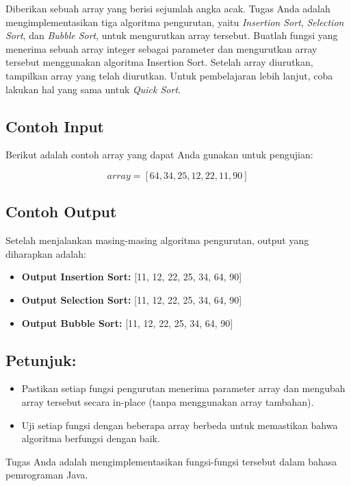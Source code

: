 Diberikan sebuah array yang berisi sejumlah angka acak. Tugas Anda adalah mengimplementasikan tiga algoritma pengurutan, yaitu \textit{Insertion Sort}, \textit{Selection Sort}, dan \textit{Bubble Sort}, untuk mengurutkan array tersebut. Buatlah fungsi yang menerima sebuah array integer sebagai parameter dan mengurutkan array tersebut menggunakan algoritma Insertion Sort. Setelah array diurutkan, tampilkan array yang telah diurutkan.
Untuk pembelajaran lebih lanjut, coba lakukan hal yang sama untuk \textit{Quick Sort}.

\subsection{Contoh Input}

Berikut adalah contoh array yang dapat Anda gunakan untuk pengujian:

\[
array = [64, 34, 25, 12, 22, 11, 90]
\]

\subsection{Contoh Output}

Setelah menjalankan masing-masing algoritma pengurutan, output yang diharapkan adalah:

\begin{itemize}
	\item \textbf{Output Insertion Sort:} [11, 12, 22, 25, 34, 64, 90]
	\item \textbf{Output Selection Sort:} [11, 12, 22, 25, 34, 64, 90]
	\item \textbf{Output Bubble Sort:} [11, 12, 22, 25, 34, 64, 90]
\end{itemize}

\subsection{Petunjuk:}

\begin{itemize}
	\item Pastikan setiap fungsi pengurutan menerima parameter array dan mengubah array tersebut secara in-place (tanpa menggunakan array tambahan).
	\item Uji setiap fungsi dengan beberapa array berbeda untuk memastikan bahwa algoritma berfungsi dengan baik.
\end{itemize}

Tugas Anda adalah mengimplementasikan fungsi-fungsi tersebut dalam bahasa pemrograman Java.

